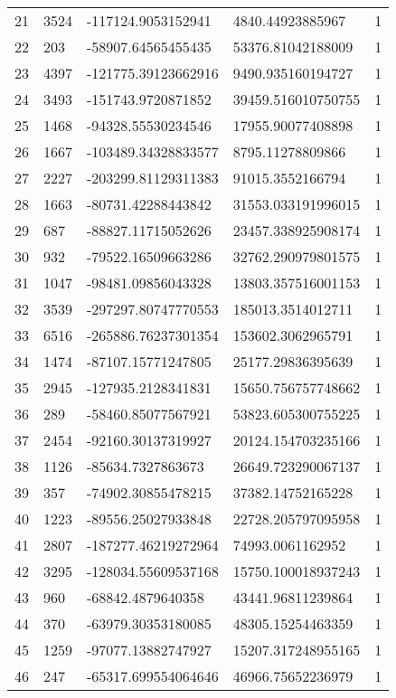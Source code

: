 \begin{longtable}{lllll}
    21 & 3524 & -117124.9053152941 & 4840.44923885967 & 1 \\
    22 & 203 & -58907.64565455435 & 53376.81042188009 & 1 \\
    23 & 4397 & -121775.39123662916 & 9490.935160194727 & 1 \\
    24 & 3493 & -151743.9720871852 & 39459.516010750755 & 1 \\
    25 & 1468 & -94328.55530234546 & 17955.90077408898 & 1 \\
    26 & 1667 & -103489.34328833577 & 8795.11278809866 & 1 \\
    27 & 2227 & -203299.81129311383 & 91015.3552166794 & 1 \\
    28 & 1663 & -80731.42288443842 & 31553.033191996015 & 1 \\
    29 & 687 & -88827.11715052626 & 23457.338925908174 & 1 \\
    30 & 932 & -79522.16509663286 & 32762.290979801575 & 1 \\
    31 & 1047 & -98481.09856043328 & 13803.357516001153 & 1 \\
    32 & 3539 & -297297.80747770553 & 185013.3514012711 & 1 \\
    33 & 6516 & -265886.76237301354 & 153602.3062965791 & 1 \\
    34 & 1474 & -87107.15771247805 & 25177.29836395639 & 1 \\
    35 & 2945 & -127935.2128341831 & 15650.756757748662 & 1 \\
    36 & 289 & -58460.85077567921 & 53823.605300755225 & 1 \\
    37 & 2454 & -92160.30137319927 & 20124.154703235166 & 1 \\
    38 & 1126 & -85634.7327863673 & 26649.723290067137 & 1 \\
    39 & 357 & -74902.30855478215 & 37382.14752165228 & 1 \\
    40 & 1223 & -89556.25027933848 & 22728.205797095958 & 1 \\
    41 & 2807 & -187277.46219272964 & 74993.0061162952 & 1 \\
    42 & 3295 & -128034.55609537168 & 15750.100018937243 & 1 \\
    43 & 960 & -68842.4879640358 & 43441.96811239864 & 1 \\
    44 & 370 & -63979.30353180085 & 48305.15254463359 & 1 \\
    45 & 1259 & -97077.13882747927 & 15207.317248955165 & 1 \\
    46 & 247 & -65317.699554064646 & 46966.75652236979 & 1 \\

\end{longtable}
